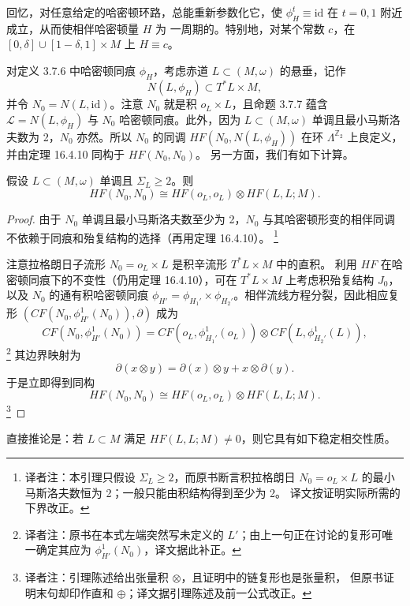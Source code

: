 回忆，对任意给定的哈密顿环路，总能重新参数化它，使
$\phi_H^t\equiv\mathrm{id}$ 在 $t=0,1$ 附近成立，从而使相伴哈密顿量 $H$ 为
一周期的。特别地，对某个常数 $c$，在
$[0,\delta]\cup[1-\delta,1]\times M$ 上 $H\equiv c$。

对定义 3.7.6 中哈密顿同痕 $\phi_H$，考虑赤道
$L\subset(M,\omega)$ 的悬垂，记作
\[
 N(L,\phi_H)\subset T^*L\times M,
\]
并令 $N_0=N(L,\mathrm{id})$。注意 $N_0$ 就是积 $o_L\times L$，且命题 3.7.7
蕴含 $\mathcal L=N(L,\phi_H)$ 与 $N_0$ 哈密顿同痕。此外，因为
$L\subset(M,\omega)$ 单调且最小马斯洛夫数为 2，$N_0$ 亦然。所以
$N_0$ 的\personFloer{}同调 $HF(N_0,N(L,\phi_H))$ 在\personNovikov{}环
$\Lambda^{\mathbb Z_2}$ 上良定义，并由定理 16.4.10 同构于 $HF(N_0,N_0)$。
另一方面，我们有如下计算。

\begin{lemma}
\label{lem:floer-product-suspension}
假设 $L\subset(M,\omega)$ 单调且 $\Sigma_L\geq2$。则
\[
 HF(N_0,N_0)\cong HF(o_L,o_L)\otimes HF(L,L;M).
\]
\end{lemma}

\begin{proof}
由于 $N_0$ 单调且最小马斯洛夫数至少为 2，$N_0$ 与其哈密顿形变的相伴\personFloer{}同调
不依赖于同痕和殆复结构的选择（再用定理 16.4.10）。
\footnote{译者注：本引理只假设 $\Sigma_L\geq2$，而原书断言积拉格朗日
$N_0=o_L\times L$ 的最小马斯洛夫数恒为 2；一般只能由积结构得到至少为 2。
译文按证明实际所需的下界改正。}

注意拉格朗日子流形 $N_0=o_L\times L$ 是积辛流形 $T^*L\times M$ 中的直积。
利用 $HF$ 在哈密顿同痕下的不变性（仍用定理 16.4.10），可在
$T^*L\times M$ 上考虑积殆复结构 $J_0$，以及 $N_0$ 的通有积哈密顿同痕
$\phi_{H'}=\phi_{H_1'}\times\phi_{H_2'}$。相伴\personFloer{}流线方程分裂，因此相应\personFloer{}复形 $(CF(N_0,\phi_{H'}^1(N_0)),\partial)$ 成为
\[
 CF(N_0,\phi_{H'}^1(N_0))=CF(o_L,\phi_{H_1'}^1(o_L))
 \otimes CF(L,\phi_{H_2'}^1(L)),
\]
\footnote{译者注：原书在本式左端突然写未定义的 $L'$；由上一句正在讨论的\personFloer{}复形可唯一确定其应为 $\phi_{H'}^1(N_0)$，译文据此补正。}
其边界映射为
\[
 \partial(x\otimes y)=\partial(x)\otimes y+x\otimes\partial(y).
\]
于是立即得到同构
\[
 HF(N_0,N_0)\cong HF(o_L,o_L)\otimes HF(L,L;M).
\]
\footnote{译者注：引理陈述给出张量积 $\otimes$，且证明中的链复形也是张量积，
但原书证明末句却印作直和 $\oplus$；译文据引理陈述及前一公式改正。}
\end{proof}

直接推论是：若 $L\subset M$ 满足 $HF(L,L;M)\neq0$，则它具有如下稳定相交性质。


